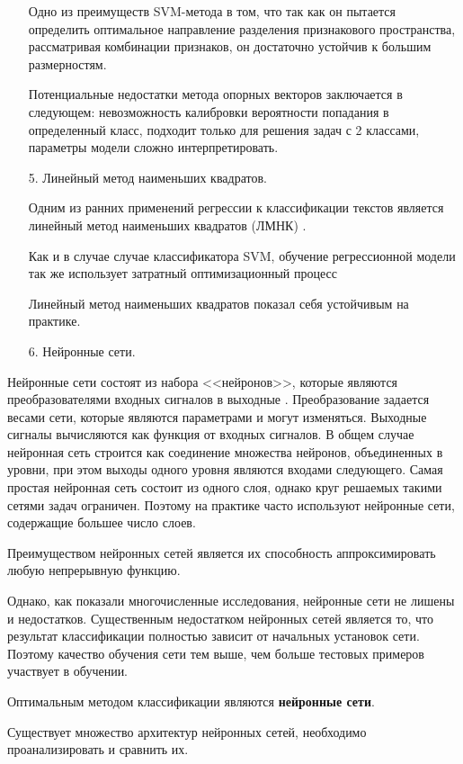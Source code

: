 \begin{enumerate}
Одно из преимуществ SVM-метода в том, что так как он пытается определить оптимальное направление разделения признакового пространства, рассматривая комбинации признаков, он достаточно устойчив к большим размерностям. 

Потенциальные недостатки метода опорных векторов заключается в следующем: невозможность калибровки вероятности попадания в определенный класс, подходит только для решения задач с 2 классами, параметры модели сложно интерпретировать.

\item[5.] Линейный метод наименьших квадратов.

Одним из ранних применений регрессии к классификации текстов является линейный метод наименьших квадратов (ЛМНК) \cite{linear}.

Как и в случае случае классификатора SVM, обучение регрессионной модели так же использует затратный оптимизационный процесс

Линейный метод наименьших квадратов показал себя устойчивым на практике.

\item[6.] Нейронные сети.
\end{enumerate}

Нейронные сети состоят из набора <<нейронов>>, которые являются преобразователями входных сигналов в выходные \cite{neuron}. Преобразование задается весами сети, которые являются параметрами и могут изменяться. Выходные сигналы вычисляются как функция от входных сигналов. В общем случае нейронная сеть строится как соединение множества нейронов, объединенных в уровни, при этом выходы одного уровня являются входами следующего.
Самая простая нейронная сеть состоит из одного слоя, однако круг решаемых такими сетями задач ограничен. Поэтому на практике часто используют нейронные сети, содержащие большее число слоев.

Преимуществом нейронных сетей является их способность аппроксимировать любую непрерывную функцию. 

Однако, как показали многочисленные исследования, нейронные сети не лишены и недостатков. Существенным недостатком нейронных сетей является то, что результат классификации полностью зависит от начальных установок сети. Поэтому качество обучения сети тем выше, чем больше тестовых примеров участвует в обучении. 

Оптимальным методом классификации являются \textbf{нейронные сети}. 

Существует множество архитектур нейронных сетей, необходимо проанализировать и сравнить их.

